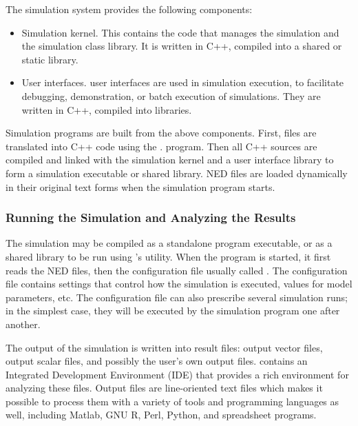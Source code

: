 The simulation system provides the following components:
\begin{itemize}
  \item{Simulation kernel. This contains the
    code that manages the simulation and the simulation class library.
    It is written in C++, compiled into a shared or static library.}
  \item{User interfaces.
     {\opp} user interfaces
    are used in simulation execution, to facilitate debugging,
    demonstration, or batch execution of simulations. They are
    written in C++, compiled into libraries.}
\end{itemize}


Simulation programs are built from the above components. First,
 files are translated into C++ code using the .
program. Then all C++ sources are compiled and linked with the simulation
kernel and a user interface library to form a simulation executable or
shared library. NED files are loaded dynamically in their original
text forms when the simulation program starts.


\subsubsection{Running the Simulation and Analyzing the Results}
\label{sec:overview:running-simulation-and-analyzing-results}

The simulation may be compiled as a standalone program executable,
or as a shared library to be run using {\opp}'s  utility.
When the program is started, it first reads the NED files,
then the configuration file usually called
. The configuration file contains settings that
control how the simulation is executed, values for model parameters, etc.
The configuration file can also prescribe several simulation runs; in
the simplest case, they will be executed by the simulation program one
after another.

The output of the simulation is written into result files: output vector
files, output scalar files,
and possibly the user's own output files.
{\opp} contains an Integrated Development Environment (IDE) that provides
a rich environment for analyzing these files. Output files are line-oriented
text files which makes it possible to process them with a variety of tools
and programming languages as well, including Matlab, GNU R, Perl, Python,
and spreadsheet programs.



